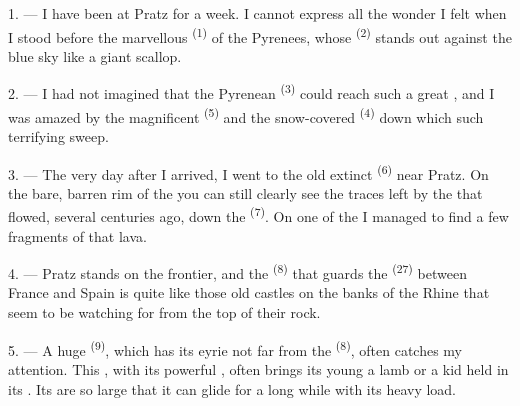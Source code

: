 
\VUsaut{4.0mm}
\VUsaut{3.0mm}

\VUsaut{3.0mm}

\VUsaut{3.0mm}

1. --- I have been at Pratz for a week. I cannot express all the wonder I felt when I stood
before the marvellous  \textsuperscript{(1)} of the Pyrenees, whose
 \textsuperscript{(2)} stands out against the blue sky like a giant scallop.

2. --- I had not imagined that the Pyrenean  \textsuperscript{(3)} could reach
such a great , and I was amazed by the magnificent 
\textsuperscript{(5)} and the snow-covered
 \textsuperscript{(4)} down which such terrifying 
sweep.

\VUsaut{3.0mm}
\VUsaut{3.0mm}

3. --- The very day after I arrived, I went to the old extinct
 \textsuperscript{(6)} near Pratz. On the bare, barren rim of the
 you can still clearly see the traces left by the
 that flowed, several centuries ago, down the
 \textsuperscript{(7)}. On one of the  I managed
to find a few fragments of that lava.

4. --- Pratz stands on the frontier, and the  \textsuperscript{(8)} that
guards the  \textsuperscript{(27)} between France and Spain is quite like those
old castles on the banks of the Rhine that seem to be watching for  from the top
of their rock.

5. --- A huge  \textsuperscript{(9)}, which has its eyrie not far from the
 \textsuperscript{(8)}, often catches my attention. This
, with its powerful , often brings its
young a lamb or a kid held in its . Its  are so large that it can
glide for a long while with its heavy load.

